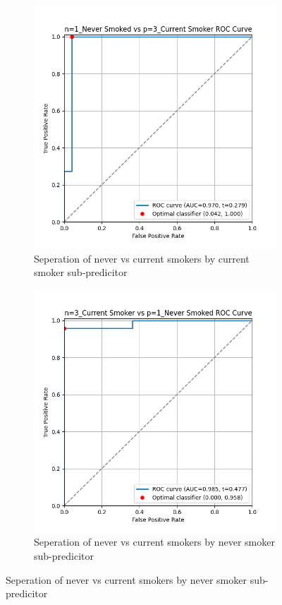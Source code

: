 \documentclass{article}
\begin{document}
\begin{figure}[H]
    \begin{subfigure}{0.43\textwidth}
        \centering
        \includegraphics[width=\linewidth]{cohort1_1v3_roc.png}
        \caption{Seperation of never vs current smokers by current smoker sub-predicitor}
    \end{subfigure}
    \hfill
    \begin{subfigure}{0.43\textwidth}
        \centering
        \includegraphics[width=\linewidth]{cohort1_3v1_roc.png}
        \caption{Seperation of never vs current smokers by never smoker sub-predicitor}
    \end{subfigure}


\end{figure}
\end{document}
